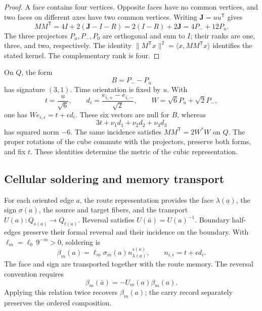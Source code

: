 \begin{proof}
A face contains four vertices. Opposite faces have no common vertices,
and two faces on different axes have two common vertices.
Writing \(\mathbf J=uu^{\mathsf T}\) gives
\[
 MM^{\mathsf T}=4I+2(\mathbf J-I-R)
 =2(I-R)+2\mathbf J=4P_-+12P_u.
\]
The three projectors \(P_u,P_-,P_0\) are orthogonal and sum to \(I\);
their ranks are one, three, and two, respectively. The identity
\(\|M^{\mathsf T}x\|^2=\langle x,MM^{\mathsf T}x\rangle\)
identifies the stated kernel. The complementary rank is four.
\end{proof}

On \(Q\), the form
\[
 B=P_--P_u
\]
has signature \((3,1)\). Time orientation is fixed by \(u\).
With
\[
 t=\frac{u}{\sqrt6},\qquad
 d_i=\frac{e_{i,+}-e_{i,-}}{\sqrt2},\qquad
 W=\sqrt6P_u+\sqrt2P_-,
\]
one has \(We_{i,\epsilon}=t+\epsilon d_i\). These six vectors
are null for \(B\), whereas
\[
 3t+\nu_1d_1+\nu_2d_2+\nu_3d_3
\]
has squared norm \(-6\). The same incidence satisfies
\(MM^{\mathsf T}=2W^*W\) on \(Q\). The proper rotations of the cube
commute with the projectors, preserve both forms, and fix \(t\).
These identities determine the metric of the cubic representation.

\subsection{Cellular soldering and memory transport}
\label{vii:sec:soldadura-celular}

For each oriented edge \(a\), the route representation provides
the face \(\lambda(\underline a)\), the sign
\(\sigma(a)\), the source and target fibers, and the transport
\(U(a):Q_{s(a)}\longrightarrow Q_{t(a)}\).
Reversal satisfies \(U(\bar a)=U(a)^{-1}\).
Boundary half-edges preserve their formal reversal and their incidence
on the boundary. With \(\ell_m=\ell_0\,9^{-m}>0\), soldering is
\begin{equation}
 \beta_m(a)=\ell_m\sigma_m(a)
              n_{\lambda(\underline a)}^{s(a)},\qquad
 n_{i,\epsilon}=t+\epsilon d_i.
 \label{vii:eq:soldadura-arista}
\end{equation}
The face and sign are transported together with the route memory.
The reversal convention requires
\begin{equation}
 \beta_m(\bar a)=-U_m(a)\beta_m(a).
 \label{vii:eq:inversion-soldadura}
\end{equation}
Applying this relation twice recovers \(\beta_m(a)\);
the carry record separately preserves the ordered composition.

